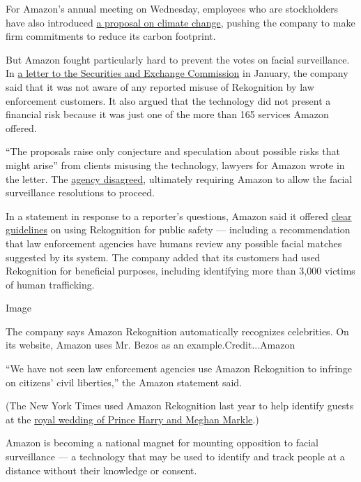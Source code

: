 For Amazon's annual meeting on Wednesday, employees who are stockholders
have also introduced
\href{https://www.nytimes3xbfgragh.onion/2019/04/10/technology/amazon-climate-change-letter.html}{a
proposal on climate change}, pushing the company to make firm
commitments to reduce its carbon footprint.

But Amazon fought particularly hard to prevent the votes on facial
surveillance. In
\href{https://www.sec.gov/divisions/corpfin/cf-noaction/14a-8/2019/johnharringtonetal032819-14a8.pdf}{a
letter to the Securities and Exchange Commission} in January, the
company said that it was not aware of any reported misuse of Rekognition
by law enforcement customers. It also argued that the technology did not
present a financial risk because it was just one of the more than 165
services Amazon offered.

``The proposals raise only conjecture and speculation about possible
risks that might arise'' from clients misusing the technology, lawyers
for Amazon wrote in the letter. The
\href{https://static1.squarespace.com/static/57693891579fb3ab7149f04b/t/5ca5354d9fbb780001c8eca3/1554330983496/Amazon.com\%2C+Inc.+SEC+Response.pdf}{agency
disagreed}, ultimately requiring Amazon to allow the facial surveillance
resolutions to proceed.

In a statement in response to a reporter's questions, Amazon said it
offered
\href{https://docs.aws.amazon.com/rekognition/latest/dg/considerations-public-safety-use-cases.html}{clear
guidelines} on using Rekognition for public safety --- including a
recommendation that law enforcement agencies have humans review any
possible facial matches suggested by its system. The company added that
its customers had used Rekognition for beneficial purposes, including
identifying more than 3,000 victims of human trafficking.

Image

The company says Amazon Rekognition automatically recognizes
celebrities. On its website, Amazon uses Mr. Bezos as an
example.Credit...Amazon

``We have not seen law enforcement agencies use Amazon Rekognition to
infringe on citizens' civil liberties,'' the Amazon statement said.

(The New York Times used Amazon Rekognition last year to help identify
guests at the
\href{https://www.nytimes3xbfgragh.onion/2018/05/19/world/europe/royal-wedding-live.html?module=inline}{royal
wedding of Prince Harry and Meghan Markle}.)

Amazon is becoming a national magnet for mounting opposition to facial
surveillance --- a technology that may be used to identify and track
people at a distance without their knowledge or consent.

